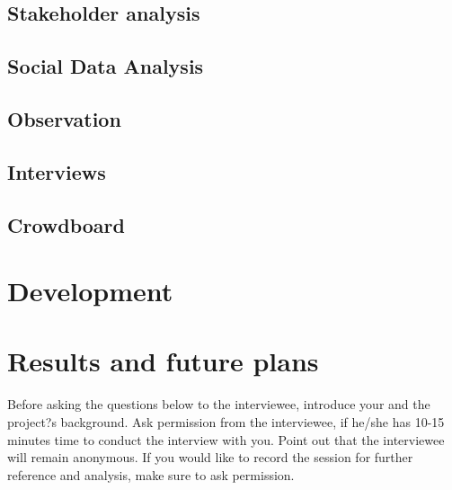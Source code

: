 \documentclass[english]{tktltiki}
\begin{document}
\subsection{Stakeholder analysis}


\subsection{Social Data Analysis}


\subsection{Observation}


\subsection{Interviews}


\subsection{Crowdboard}
\label{sec:crowdboard}


\section{Development}
\label{sec:development}


\section{Results and future plans}
\label{sec:results}


\pagebreak
\nocite{*}




\lastpage
\appendices
\pagestyle{empty}
\singlespacing

\label{sec:interview-questions}
Before asking the questions below to the interviewee, introduce your and the project?s background. Ask permission from the interviewee, if he/she has 10-15 minutes time to conduct the interview with you. Point out that the interviewee will remain anonymous. If you would like to record the session for further reference and analysis, make sure to ask permission.
\end{document}
